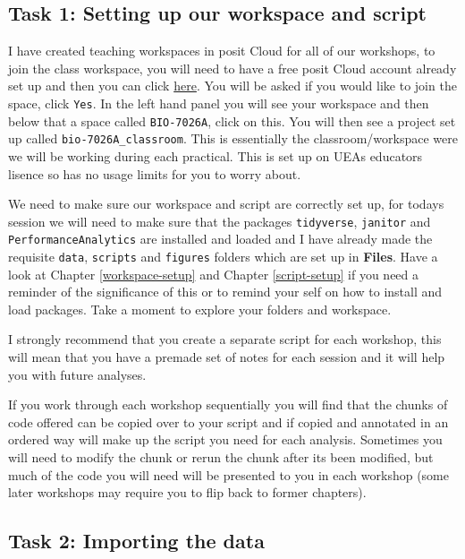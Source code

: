 \documentclass[
]{book}
\begin{document}
\hypertarget{task-1-setting-up-our-workspace-and-script}{%
\subsection{Task 1: Setting up our workspace and script}\label{task-1-setting-up-our-workspace-and-script}}

I have created teaching workspaces in posit Cloud for all of our workshops, to join the class workspace, you will need to have a free posit Cloud account already set up and then you can click \href{https://posit.cloud/spaces/419887/join?access_code=kUyBX1RavEsGaGDcQfS5BuUZDca_06DhoYsDEtdt}{here}. You will be asked if you would like to join the space, click \texttt{Yes}. In the left hand panel you will see your workspace and then below that a space called \texttt{BIO-7026A}, click on this. You will then see a project set up called \texttt{bio-7026A\_classroom}. This is essentially the classroom/workspace were we will be working during each practical. This is set up on UEAs educators lisence so has no usage limits for you to worry about.

We need to make sure our workspace and script are correctly set up, for todays session we will need to make sure that the packages \texttt{tidyverse}, \texttt{janitor} and \texttt{PerformanceAnalytics} are installed and loaded and I have already made the requisite \texttt{data}, \texttt{scripts} and \texttt{figures} folders which are set up in \textbf{Files}. Have a look at Chapter \ref{workspace-setup} and Chapter \ref{script-setup} if you need a reminder of the significance of this or to remind your self on how to install and load packages. Take a moment to explore your folders and workspace.

I strongly recommend that you create a separate script for each workshop, this will mean that you have a premade set of notes for each session and it will help you with future analyses.

If you work through each workshop sequentially you will find that the chunks of code offered can be copied over to your script and if copied and annotated in an ordered way will make up the script you need for each analysis. Sometimes you will need to modify the chunk or rerun the chunk after its been modified, but much of the code you will need will be presented to you in each workshop (some later workshops may require you to flip back to former chapters).

\hypertarget{task-2-importing-the-data}{%
\subsection{Task 2: Importing the data}\label{task-2-importing-the-data}}
\end{document}
